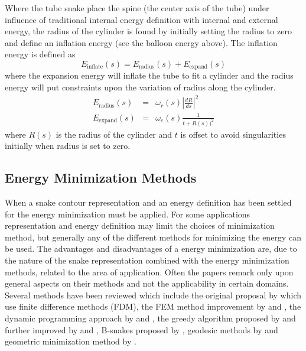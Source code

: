 Where the tube snake place the spine (the center axis of the tube)
under influence of traditional internal energy definition with
internal and external energy, the radius of the cylinder is found by
initially setting the radius to zero and define an inflation energy
(see the balloon energy above). The inflation energy is defined as
\begin{equation}
  \nonumber
  E_{\text{inflate}}(s) = E_{\text{radius}}(s) + E_{\text{expand}}(s) 
\end{equation}
where the expansion energy will inflate the tube to fit a cylinder and
the radius energy will put constraints upon the variation of radius
along the cylinder.
\begin{eqnarray}
  \nonumber
  E_{\text{radius}}(s) &=& \omega_r(s) \left\lvert\frac{dR}{ds}\right\rvert^2 \\
  E_{\text{expand}}(s) &=& \omega_e(s) \frac{1}{t + R(s))^2}
\end{eqnarray}
where $R(s)$ is the radius of the cylinder and $t$ is offset to avoid
singularities initially when radius is set to zero.



\subsection{Energy Minimization Methods}
\label{sec:energy-minimization-methods}

When a snake contour representation and an energy definition has been
settled for the energy minimization must be applied. For some
applications representation and energy definition may limit the
choices of minimization method, but generally any of the different
methods for minimizing the energy can be used. The advantages and
disadvantages of a energy minimization are, due to the nature of the
snake representation combined with the energy minimization methods,
related to the area of application. Often the papers remark only upon
general aspects on their methods and not the applicability in certain
domains.  Several methods have been reviewed which include the
original proposal by \citet{kass88} which use finite difference
methods (FDM), the FEM method improvement by \citet{cohen91} and
\citet{cohen93}, the dynamic programming approach by \citet{amini88}
and \citet{amini90}, the greedy algorithm proposed by
\citet{williams90} and further improved by \citet{yan94} and
\citet{yan97}, B-snakes proposed by \citet{menet90}, geodesic methods
by \citet{lorigo98,caselles97} and geometric minimization method by
\citet{osher88}.


